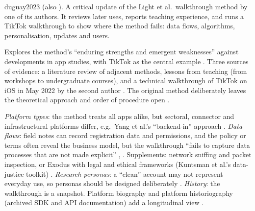 \begin{papercard}{duguay2023}
   (also ). A critical update of the Light et al.\ walkthrough method by one of its authors. It reviews later uses, reports teaching experience, and runs a TikTok walkthrough to show where the method fails: data flows, algorithms, personalisation, updates and users.

 Explores the method's ``enduring strengths and emergent weaknesses'' against developments in app studies, with TikTok as the central example . Three sources of evidence: a literature review of adjacent methods, lessons from teaching (from workshops to undergraduate courses), and a technical walkthrough of TikTok on iOS in May 2022 by the second author . The original method deliberately leaves the theoretical approach and order of procedure open .

 \emph{Platform types}: the method treats all apps alike, but sectoral, connector and infrastructural platforms differ, e.g.\ Yang et al.'s ``backend-in'' approach . \emph{Data flows}: field notes can record registration data and permissions, and the policy or terms often reveal the business model, but the walkthrough ``fails to capture data processes that are not made explicit'' , . Supplements: network sniffing and packet inspection, or Exodus with legal and ethical frameworks (Kuntsman et al.'s data-justice toolkit) . \emph{Research personas}: a ``clean'' account may not represent everyday use, so personas should be designed deliberately . \emph{History}: the walkthrough is a snapshot. Platform biography and platform historiography (archived SDK and API documentation) add a longitudinal view .


\end{papercard}
